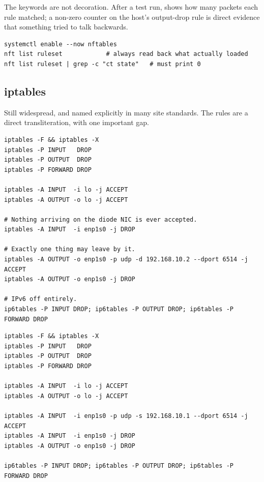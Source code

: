 \documentclass[11pt,a4paper]{article}
\begin{document}
The  keywords are not decoration. After a test run,
 shows how many packets each rule matched; a non-zero
counter on the \dstside{} host's output-drop rule is direct evidence that
something tried to talk backwards.

\begin{lstlisting}[style=shell]
systemctl enable --now nftables
nft list ruleset            # always read back what actually loaded
nft list ruleset | grep -c "ct state"   # must print 0
\end{lstlisting}

\subsection{iptables}

Still widespread, and named explicitly in many site standards. The rules are
a direct transliteration, with one important gap.

\begin{lstlisting}[style=shell,caption={SOURCE host}]
iptables -F && iptables -X
iptables -P INPUT   DROP
iptables -P OUTPUT  DROP
iptables -P FORWARD DROP

iptables -A INPUT  -i lo -j ACCEPT
iptables -A OUTPUT -o lo -j ACCEPT

# Nothing arriving on the diode NIC is ever accepted.
iptables -A INPUT  -i enp1s0 -j DROP

# Exactly one thing may leave by it.
iptables -A OUTPUT -o enp1s0 -p udp -d 192.168.10.2 --dport 6514 -j ACCEPT
iptables -A OUTPUT -o enp1s0 -j DROP

# IPv6 off entirely.
ip6tables -P INPUT DROP; ip6tables -P OUTPUT DROP; ip6tables -P FORWARD DROP
\end{lstlisting}

\begin{lstlisting}[style=shell,caption={DESTINATION host}]
iptables -F && iptables -X
iptables -P INPUT   DROP
iptables -P OUTPUT  DROP
iptables -P FORWARD DROP

iptables -A INPUT  -i lo -j ACCEPT
iptables -A OUTPUT -o lo -j ACCEPT

iptables -A INPUT  -i enp1s0 -p udp -s 192.168.10.1 --dport 6514 -j ACCEPT
iptables -A INPUT  -i enp1s0 -j DROP
iptables -A OUTPUT -o enp1s0 -j DROP

ip6tables -P INPUT DROP; ip6tables -P OUTPUT DROP; ip6tables -P FORWARD DROP
\end{lstlisting}
\end{document}
